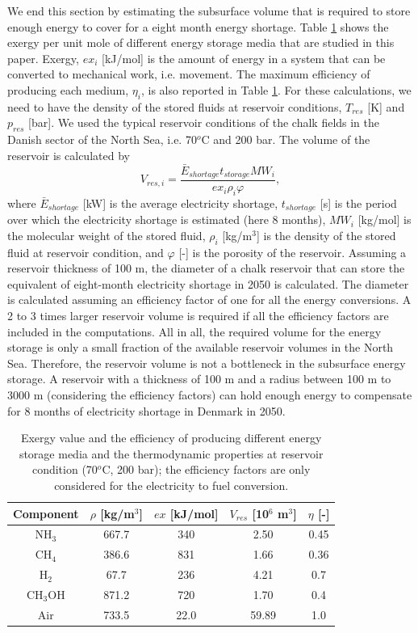 \documentclass{ECOS_2021}
\begin{document}
We end this section by estimating the subsurface volume that is required
to store enough energy to cover for a eight month energy shortage.
Table \ref{tab:Exergy-value-efficiency} shows the exergy per unit
mole of different energy storage media that are studied in this paper.
Exergy, $ex_{i}$ {[}kJ/mol{]} is the amount of energy in a system
that can be converted to mechanical work, i.e. movement. The maximum
efficiency of producing each medium, $\eta_{i}$, is also reported
in Table \ref{tab:Exergy-value-efficiency}. For these calculations,
we need to have the density of the stored fluids at reservoir conditions,
$T_{res}$ {[}K{]} and $p_{res}$ {[}bar{]}. We used the typical reservoir
conditions of the chalk fields in the Danish sector of the North Sea,
i.e. 70$^{o}$C and 200 bar. The volume of the reservoir is calculated
by
\[
V_{res,i}=\frac{\bar{E}_{shortage}t_{storage}MW_{i}}{ex_{i}\rho_{i}\varphi},
\]
where $\bar{E}_{shortage}$ {[}kW{]} is the average electricity shortage,
$t_{shortage}$ {[}s{]} is the period over which the electricity shortage
is estimated (here 8 months), $MW_{i}$ {[}kg/mol{]} is the molecular
weight of the stored fluid, $\rho_{i}$ {[}kg/m$^{3}${]} is the density
of the stored fluid at reservoir condition, and $\varphi$ {[}-{]}
is the porosity of the reservoir. Assuming a reservoir thickness of
100 m, the diameter of a chalk reservoir that can store the equivalent
of eight-month electricity shortage in 2050 is calculated. The diameter is calculated assuming
an efficiency factor of one for all the energy conversions. A 2 to
3 times larger reservoir volume is required if all the efficiency
factors are included in the computations. All in all, the required
volume for the energy storage is only a small fraction of the available
reservoir volumes in the North Sea. Therefore, the reservoir volume
is not a bottleneck in the subsurface energy storage. A reservoir
with a thickness of 100 m and a radius between 100 m to 3000 m (considering
the efficiency factors) can hold enough energy to compensate for 8
months of electricity shortage in Denmark in 2050. 

\begin{table}[h]
\normalsize
\caption{\label{tab:Exergy-value-efficiency}Exergy value and the efficiency
of producing different energy storage media and the thermodynamic
properties at reservoir condition (70$^{o}$C, 200 bar); the efficiency
factors are only considered for the electricity to fuel conversion.}

\begin{center}
\begin{tabular}{ccccc}
\hline 
Component & $\rho$ {[}kg/m$^{3}${]} & $ex$ {[}kJ/mol{]} & $V_{res}$ {[}10$^{6}$ m$^{3}${]} & $\eta$ {[}-{]}\tabularnewline
\hline 
NH$_{3}$ & 667.7 & 340 & 2.50 & 0.45\tabularnewline
CH$_{4}$ & 386.6 & 831 & 1.66 & 0.36\tabularnewline
H$_{2}$ & 67.7 & 236 & 4.21 & 0.7\tabularnewline
CH$_{3}$OH & 871.2 & 720 & 1.70 & 0.4\tabularnewline
Air & 733.5 & 22.0 & 59.89 & 1.0\tabularnewline
\hline 
\end{tabular}
\end{center}
\end{table}
\end{document}

